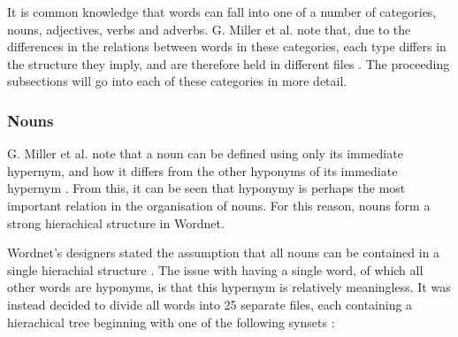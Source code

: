 \documentclass[]{article}
\begin{document}
It is common knowledge that words can fall into one of a number of categories, nouns, adjectives, verbs and adverbs. G. Miller et al. note that, due to the differences in the relations between words in these categories, each type differs in the structure they imply, and are therefore held in different files \cite{WN1Introduction}. The proceeding subsections will go into each of these categories in more detail.

\subsubsection{Nouns}
\label{Nouns}
G. Miller et al. note that a noun can be defined using only its immediate hypernym, and how it differs from the other hyponyms of its immediate hypernym \cite{WN2Nouns}. From this, it can be seen that hyponymy is perhaps the most important relation in the organisation of nouns. For this reason, nouns form a strong hierachical structure in Wordnet.

Wordnet's designers stated the assumption that all nouns can be contained in a single hierachial structure \cite{WN2Nouns}. The issue with having a single word, of which all other words are hyponyms, is that this hypernym is relatively meaningless. It was instead decided to divide all words into 25 separate files, each containing a hierachical tree beginning with one of the following synsets \cite{WN2Nouns}:
\end{document}
